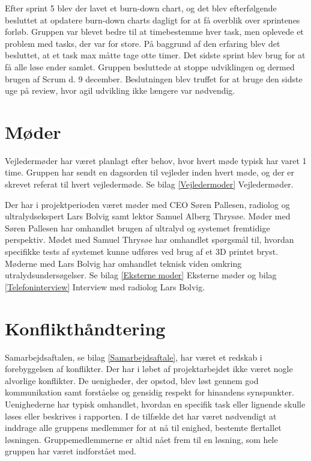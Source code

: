 Efter sprint 5 blev der lavet et burn-down chart, og det blev efterfølgende besluttet at opdatere burn-down charts dagligt for at få overblik over sprintenes forløb. Gruppen var blevet bedre til at timebestemme hver task, men oplevede et problem med tasks, der var for store. På baggrund af den erfaring blev det besluttet, at et task max måtte tage otte timer. Det sidste sprint blev brug for at få alle løse ender samlet. Gruppen besluttede at stoppe udviklingen og dermed brugen af Scrum d. 9 december. Beslutningen blev truffet for at bruge den sidste uge på review, hvor agil udvikling ikke længere var nødvendig. 
 
\section{Møder}
Vejledermøder har været planlagt efter behov, hvor hvert møde typisk har varet 1 time. Gruppen har sendt en dagsorden til vejleder inden hvert møde, og der er skrevet referat til hvert vejledermøde. Se bilag \ref{Vejledermoder} Vejledermøder.
 
Der har i projektperioden været møder med CEO Søren Pallesen, radiolog og ultralydsekspert Lars Bolvig samt lektor Samuel Alberg Thrysøe. Møder med Søren Pallesen har omhandlet brugen af ultralyd og systemet fremtidige perspektiv. Mødet med Samuel Thrysøe har omhandlet spørgsmål til, hvordan specifikke tests af systemet kunne udføres ved brug af et 3D printet bryst. Møderne med Lars Bolvig har omhandlet teknisk viden omkring utralydsundersøgelser. Se bilag \ref{Eksterne moder} Eksterne møder og bilag \ref{Telefoninterview} Interview med radiolog Lars Bolvig. 

\section{Konflikthåndtering}
Samarbejdsaftalen, se bilag \ref{Samarbejdsaftale}, har været et redskab i forebyggelsen af konflikter. Der har i løbet af projektarbejdet ikke været nogle alvorlige konflikter. De uenigheder, der opstod, blev løst gennem god kommunikation samt forståelse og gensidig respekt for hinandens synspunkter. Uenighederne har typisk omhandlet, hvordan en specifik task eller lignende skulle løses eller beskrives i rapporten. I de tilfælde det har været nødvendigt at inddrage alle gruppens medlemmer for at nå til enighed, bestemte flertallet løsningen. Gruppemedlemmerne er altid nået frem til en løsning, som hele gruppen har været indforstået med.

